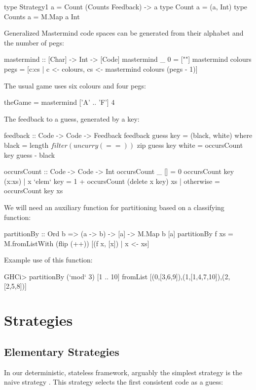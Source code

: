 \documentclass[a4paper]{article}
\makeatletter
\theoremstyle{definition}
\newcommand{\cmd}[1]{\Verb@#1@}
\newcommand{\strategy}[1]{\marginpar{\bigskip\cmd{#1}}}
\makeatother
\begin{document}
\begin{code}
type Strategy1 a = Count (Counts Feedback) -> a
type Count a     = (a, Int)
type Counts a    = M.Map a Int
\end{code}

Generalized Mastermind code spaces can be generated from their alphabet and the number of pegs:

\begin{code}
mastermind :: [Char] -> Int -> [Code]
mastermind _       0    = [""]
mastermind colours pegs = [c:cs |
  c  <- colours,
  cs <- mastermind colours (pegs - 1)]
\end{code}

The usual game uses six colours and four pegs:

\begin{code}
theGame = mastermind ['A' .. 'F'] 4
\end{code}

The feedback to a guess, generated by a key:

\begin{code}
feedback :: Code -> Code -> Feedback
feedback guess key = (black, white)
  where black = length $ filter (uncurry (==)) $ zip guess key
        white = occursCount key guess - black

occursCount :: Code -> Code -> Int
occursCount _   []     = 0
occursCount key (x:xs)
  | x `elem` key       = 1 + occursCount (delete x key) xs
  | otherwise          = occursCount key xs
\end{code}

We will need an auxiliary function for partitioning based on a classifying function:

\begin{code}
partitionBy :: Ord b => (a -> b) -> [a] -> M.Map b [a]
partitionBy f xs = M.fromListWith (flip (++))
  [(f x, [x]) | x <- xs]
\end{code}

Example use of this function:
\begin{cmdsession}
GHCi> partitionBy (`mod` 3) [1 .. 10]
fromList [(0,[3,6,9]),(1,[1,4,7,10]),(2,[2,5,8])]
\end{cmdsession}


\section*{Strategies}

\subsection*{Elementary Strategies}
In our deterministic, stateless framework, arguably the simplest strategy is the naive strategy \citep{Shapiro1983:pml}.
This strategy selects the first consistent code as a guess:
\strategy{naivePlay}
\end{document}
